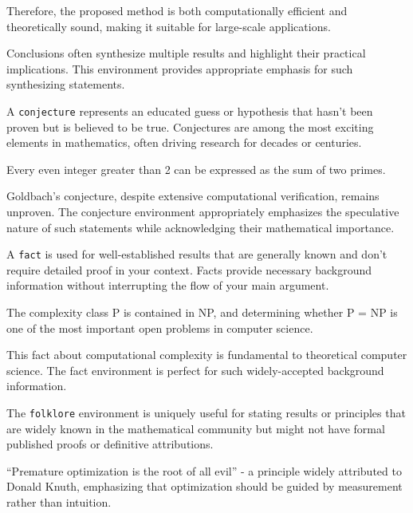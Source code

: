 \documentclass[9pt]{amsart}
\begin{document}
\begin{conclusion}
    Therefore, the proposed method is both computationally efficient and theoretically sound, making it suitable for large-scale applications.
\end{conclusion}

Conclusions often synthesize multiple results and highlight their practical
implications. This environment provides appropriate emphasis for such
synthesizing statements.

A \texttt{conjecture} represents an educated guess or hypothesis that hasn't
been proven but is believed to be true. Conjectures are among the most exciting
elements in mathematics, often driving research for decades or centuries.

\begin{conjecture}
    Every even integer greater than 2 can be expressed as the sum of two primes.
\end{conjecture}

Goldbach's conjecture, despite extensive computational verification, remains
unproven. The conjecture environment appropriately emphasizes the speculative
nature of such statements while acknowledging their mathematical importance.

A \texttt{fact} is used for well-established results that are generally known
and don't require detailed proof in your context. Facts provide necessary
background information without interrupting the flow of your main argument.

\begin{fact}
    The complexity class P is contained in NP, and determining whether P = NP is one of the most important open problems in computer science.
\end{fact}

This fact about computational complexity is fundamental to theoretical computer
science. The fact environment is perfect for such widely-accepted background
information.

The \texttt{folklore} environment is uniquely useful for stating results or
principles that are widely known in the mathematical community but might not
have formal published proofs or definitive attributions.

\begin{folklore}
    ``Premature optimization is the root of all evil'' - a principle widely attributed to Donald Knuth, emphasizing that optimization should be guided by measurement rather than intuition.
\end{folklore}
\end{document}
